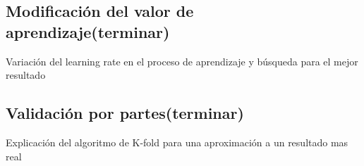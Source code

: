 \subsection{Modificación del valor de aprendizaje(terminar)}
Variación del learning rate en el proceso de aprendizaje y búsqueda para el mejor resultado

\subsection{Validación por partes(terminar)}
Explicación del algoritmo de K-fold para una aproximación a un resultado mas real


